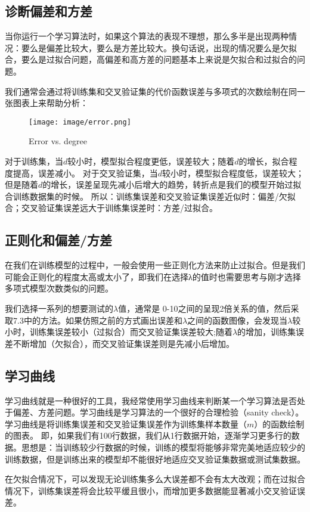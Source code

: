 \documentclass[cn,hazy,blue,normal,14pt]{elegantnote}
\begin{document}
\subsection{诊断偏差和方差}
当你运行一个学习算法时，如果这个算法的表现不理想，那么多半是出现两种情况：要么是偏差比较大，要么是方差比较大。换句话说，出现的情况要么是欠拟合，要么是过拟合问题，高偏差和高方差的问题基本上来说是欠拟合和过拟合的问题。

我们通常会通过将训练集和交叉验证集的代价函数误差与多项式的次数绘制在同一张图表上来帮助分析：
\begin{figure}[H]
    \centering
    \texttt{[image: image/error.png]}
    \caption{Error vs. degree}
\end{figure}

对于训练集，当$d$较小时，模型拟合程度更低，误差较大；随着$d$的增长，拟合程度提高，误差减小。 对于交叉验证集，当$d$较小时，模型拟合程度低，误差较大；但是随着$d$的增长，误差呈现先减小后增大的趋势，转折点是我们的模型开始过拟合训练数据集的时候。 所以：训练集误差和交叉验证集误差近似时：偏差/欠拟合；交叉验证集误差远大于训练集误差时：方差/过拟合。

\subsection{正则化和偏差/方差}
在我们在训练模型的过程中，一般会使用一些正则化方法来防止过拟合。但是我们可能会正则化的程度太高或太小了，即我们在选择λ的值时也需要思考与刚才选择多项式模型次数类似的问题。

我们选择一系列的想要测试的$\lambda$值，通常是 0-10之间的呈现2倍关系的值，然后采取7.3中的方法。如果仿照之前的方式画出误差和$\lambda$之间的函数图像，会发现当$\lambda$较小时，训练集误差较小（过拟合）而交叉验证集误差较大;随着$\lambda$的增加，训练集误差不断增加（欠拟合），而交叉验证集误差则是先减小后增加。
\subsection{学习曲线}
学习曲线就是一种很好的工具，我经常使用学习曲线来判断某一个学习算法是否处于偏差、方差问题。学习曲线是学习算法的一个很好的合理检验（sanity check）。学习曲线是将训练集误差和交叉验证集误差作为训练集样本数量（$m$）的函数绘制的图表。 即，如果我们有100行数据，我们从1行数据开始，逐渐学习更多行的数据。思想是：当训练较少行数据的时候，训练的模型将能够非常完美地适应较少的训练数据，但是训练出来的模型却不能很好地适应交叉验证集数据或测试集数据。

在欠拟合情况下，可以发现无论训练集多么大误差都不会有太大改观；而在过拟合情况下，训练集误差将会比较平缓且很小，而增加更多数据能显著减小交叉验证误差。
\end{document}
